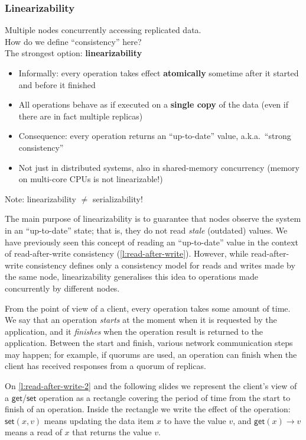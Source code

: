 \begin{frame}
    \label{s:linearizability}
    \frametitle{Linearizability}
    Multiple nodes concurrently accessing replicated data.\\
    How do we define ``consistency'' here?\\[1em]\pause
    The strongest option: \textbf{linearizability}\pause
    \begin{itemize}
        \item Informally: every operation takes effect \textbf{atomically} sometime after it started and before it finished\pause
        \item All operations behave as if executed on a \textbf{single copy} of the data (even if there are in fact multiple replicas)\pause
        \item Consequence: every operation returns an ``up-to-date'' value, a.k.a.\ ``strong consistency''\pause
        \item Not just in distributed systems, also in shared-memory concurrency (memory on multi-core CPUs is not linearizable!)\pause
    \end{itemize}
    Note: linearizability $\neq$ serializability!
\end{frame}
\label{l:linearizability}

The main purpose of linearizability is to guarantee that nodes observe the system in an ``up-to-date'' state; that is, they do not read \emph{stale} (outdated) values.
We have previously seen this concept of reading an ``up-to-date'' value in the context of read-after-write consistency (\autoref{l:read-after-write}).
However, while read-after-write consistency defines only a consistency model for reads and writes made by the same node, linearizability generalises this idea to operations made concurrently by different nodes.

From the point of view of a client, every operation takes some amount of time.
We say that an operation \emph{starts} at the moment when it is requested by the application, and it \emph{finishes} when the operation result is returned to the application.
Between the start and finish, various network communication steps may happen; for example, if quorums are used, an operation can finish when the client has received responses from a quorum of replicas.

On \autoref{l:read-after-write-2} and the following slides we represent the client's view of a $\mathsf{get}$/$\mathsf{set}$ operation as a rectangle covering the period of time from the start to finish of an operation.
Inside the rectangle we write the effect of the operation: $\mathsf{set}(x,v)$ means updating the data item $x$ to have the value $v$, and $\mathsf{get}(x) \rightarrow v$ means a read of $x$ that returns the value $v$.

